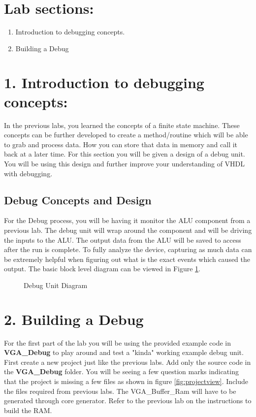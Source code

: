 \documentclass{article}
\begin{document}
\section{Lab sections:}
\begin{enumerate}
  \item Introduction to debugging concepts.
  \item Building a Debug
\end{enumerate}

\newpage
\section{1. Introduction to debugging concepts:}
In the previous labs, you learned the concepts of a finite state machine. These concepts can be further developed to create a method/routine which will be able to grab and process data. How you can store that data in memory and call it back at a later time. For this section you will be given a design of a debug unit. You will be using this design and further improve your understanding of VHDL with debugging.

\subsection{Debug Concepts and Design}
For the Debug process, you will be having it monitor the ALU component from a previous lab. The debug unit will wrap around the component and will be driving the inputs to the ALU. The output data from the ALU will be saved to access after the run is complete. To fully analyze the device, capturing as much data can be extremely helpful when figuring out what is the exact events which caused the output. The basic block level diagram can be viewed in Figure \ref{fig:DebugBlock}.

\begin{figure}[!htbp]
  \centering
  \caption{Debug Unit Diagram}
  \label{fig:DebugBlock}
\end{figure}

\section{2. Building a Debug}
For the first part of the lab you will be using the provided example code in \textbf{VGA\_Debug} to play around and test a "kinda" working example debug unit. First create a new project just like the previous labs. Add only the source code in the \textbf{VGA\_Debug} folder. You will be seeing a few question marks indicating that the project is missing a few files as shown in figure \ref{fig:projectview}. Include the files required from previous labs. The VGA\_Buffer\_Ram will have to be generated through core generator. Refer to the previous lab on the instructions to build the RAM.
\end{document}
